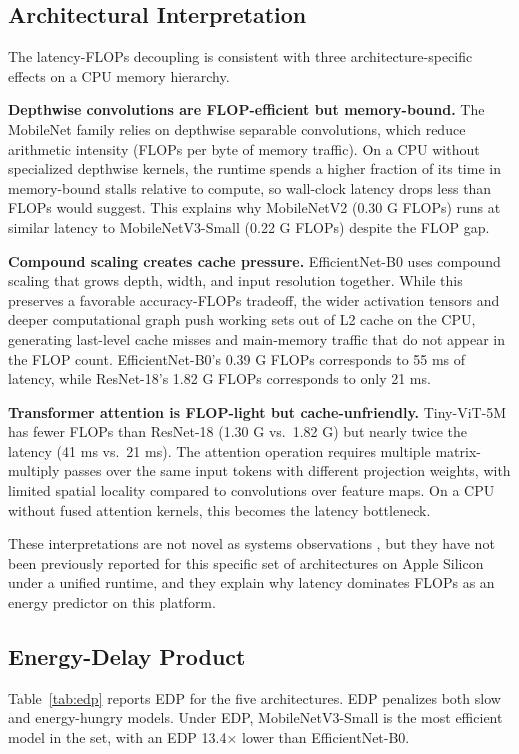 \documentclass[conference]{IEEEtran}
\begin{document}
\subsection{Architectural Interpretation}
The latency-FLOPs decoupling is consistent with three architecture-specific
effects on a CPU memory hierarchy.

\textbf{Depthwise convolutions are FLOP-efficient but memory-bound.} The
MobileNet family relies on depthwise separable convolutions, which reduce
arithmetic intensity (FLOPs per byte of memory traffic). On a CPU without
specialized depthwise kernels, the runtime spends a higher fraction of its
time in memory-bound stalls relative to compute, so wall-clock latency drops
less than FLOPs would suggest. This explains why MobileNetV2 (0.30 G FLOPs)
runs at similar latency to MobileNetV3-Small (0.22 G FLOPs) despite the FLOP
gap.

\textbf{Compound scaling creates cache pressure.} EfficientNet-B0 uses
compound scaling that grows depth, width, and input resolution together. While
this preserves a favorable accuracy-FLOPs tradeoff, the wider activation
tensors and deeper computational graph push working sets out of L2 cache on
the CPU, generating last-level cache misses and main-memory traffic that do
not appear in the FLOP count. EfficientNet-B0's 0.39 G FLOPs corresponds to
55 ms of latency, while ResNet-18's 1.82 G FLOPs corresponds to only 21 ms.

\textbf{Transformer attention is FLOP-light but cache-unfriendly.} Tiny-ViT-5M
has fewer FLOPs than ResNet-18 (1.30 G vs.\ 1.82 G) but nearly twice the
latency (41 ms vs.\ 21 ms). The attention operation requires multiple
matrix-multiply passes over the same input tokens with different projection
weights, with limited spatial locality compared to convolutions over feature
maps. On a CPU without fused attention kernels, this becomes the latency
bottleneck.

These interpretations are not novel as systems observations
\cite{eyeriss2017,hardwareaware2019}, but they have not been previously
reported for this specific set of architectures on Apple Silicon under a
unified runtime, and they explain why latency dominates FLOPs as an energy
predictor on this platform.

\subsection{Energy-Delay Product}
Table~\ref{tab:edp} reports EDP for the five architectures. EDP penalizes
both slow and energy-hungry models. Under EDP, MobileNetV3-Small is the most
efficient model in the set, with an EDP 13.4$\times$ lower than
EfficientNet-B0.
\end{document}
